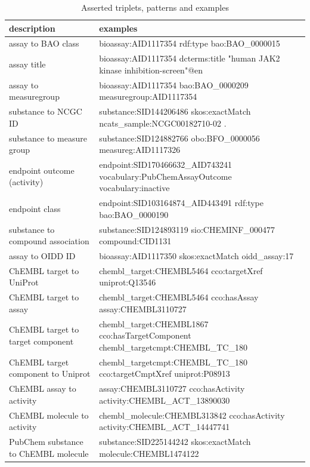\begin{table}[]
\caption{Asserted triplets, patterns and examples }
\label{tab:opddr_04}
\centering
\begin{tabular}{p{0.3\linewidth}p{0.7\linewidth}}
\hline
\textbf{description} & \textbf{examples} \\
\hline
assay to BAO class & bioassay:AID1117354 rdf:type bao:BAO\_0000015 \\
assay title & bioassay:AID1117354 dcterms:title "human JAK2 kinase inhibition-screen"@en \\
assay to measuregroup & bioassay:AID1117354 bao:BAO\_0000209 measuregroup:AID1117354 \\
substance to NCGC ID & substance:SID144206486 skos:exactMatch ncats\_sample:NCGC00182710-02 . \\
substance to measure group & substance:SID124882766 obo:BFO\_0000056 measureg:AID1117326 \\
endpoint outcome (activity) & endpoint:SID170466632\_AID743241 vocabulary:PubChemAssayOutcome vocabulary:inactive \\
endpoint class & endpoint:SID103164874\_AID443491 rdf:type bao:BAO\_0000190 \\
substance to compound association & substance:SID124893119 sio:CHEMINF\_000477 compound:CID1131 \\
assay to OIDD ID & bioassay:AID1117350 skos:exactMatch  oidd\_assay:17 \\
ChEMBL target to UniProt & chembl\_target:CHEMBL5464 cco:targetXref uniprot:Q13546 \\
ChEMBL target to assay & chembl\_target:CHEMBL5464 cco:hasAssay assay:CHEMBL3110727 \\
ChEMBL target to target component & chembl\_target:CHEMBL1867 cco:hasTargetComponent chembl\_targetcmpt:CHEMBL\_TC\_180 \\
ChEMBL target component to Uniprot & chembl\_targetcmpt:CHEMBL\_TC\_180 cco:targetCmptXref uniprot:P08913 \\
ChEMBL assay to activity & assay:CHEMBL3110727 cco:hasActivity activity:CHEMBL\_ACT\_13890030 \\
ChEMBL molecule to activity & chembl\_molecule:CHEMBL313842 cco:hasActivity activity:CHEMBL\_ACT\_14447741 \\
PubChem substance to ChEMBL molecule & substance:SID225144242 skos:exactMatch molecule:CHEMBL1474122  \\
\hline
\end{tabular}
\end{table}

